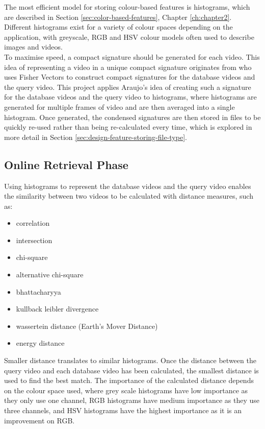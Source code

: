The most efficient model for storing colour-based features is histograms, which are described in Section \ref{sec:color-based-features}, Chapter \ref{ch:chapter2}. Different histograms exist for a variety of colour spaces depending on the application, with greyscale, RGB and HSV colour models often used to describe images and videos.\\ 

To maximise speed, a compact signature should be generated for each video. This idea of representing a video in a unique compact signature originates from \cite{araujo2017i2v} who uses Fisher Vectors to construct compact signatures for the database videos and the query video. This project applies Araujo's idea of creating such a signature for the database videos and the query video to histograms, where histograms are generated for multiple frames of video and are then averaged into a single histogram. Once generated, the condensed signatures are then stored in files to be quickly re-used rather than being re-calculated every time, which is explored in more detail in Section \ref{sec:design-feature-storing-file-type}. 

\subsection{Online Retrieval Phase}
\label{sec:design-online-retrieval}

Using histograms to represent the database videos and the query video enables the similarity between two videos to be calculated with distance measures, such as:
\begin{itemize}
    \item correlation
    \item intersection
    \item chi-square
    \item alternative chi-square
    \item bhattacharyya
    \item kullback leibler divergence
    \item wassertein distance (Earth's Mover Distance)
    \item energy distance
\end{itemize}

Smaller distance translates to similar histograms. Once the distance between the query video and each database video has been calculated, the smallest distance is used to find the best match. The importance of the calculated distance depends on the colour space used, where grey scale histograms have low importance as they only use one channel, RGB histograms have medium importance as they use three channels, and HSV histograms have the highest importance as it is an improvement on RGB.

